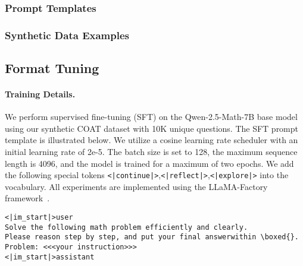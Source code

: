 \newpage
\subsubsection{Prompt Templates} \label{subsec:template}

\vspace{-1.5em}

\vspace{-1.5em}

\vspace{-1.5em}

\vspace{-1.5em}

\vspace{-1.5em}


\subsubsection{Synthetic Data Examples} \label{subsec:example-synthetic}






\clearpage
\subsection{Format Tuning}

\paragraph{Training Details.}
We perform supervised fine-tuning (SFT) on the Qwen-2.5-Math-7B base model using our synthetic COAT dataset with 10K unique questions. The SFT prompt template is illustrated below. We utilize a cosine learning rate scheduler with an initial learning rate of 2e-5. The batch size is set to 128, the maximum sequence length is 4096, and the model is trained for a maximum of two epochs. We add the following special tokens \texttt{<|continue|>},\texttt{<|reflect|>},\texttt{<|explore|>} into the vocabulary. All experiments are implemented using the LLaMA-Factory framework~\cite{llamafactory}.


\begin{tcolorbox}[green_box, title = {{Prompt Template 3: SFT and RL}}]
\label{box:prompt_template_3}
\begin{verbatim}
<|im_start|>user
Solve the following math problem efficiently and clearly.
Please reason step by step, and put your final answerwithin \boxed{}.
Problem: <<<your instruction>>>
<|im_start|>assistant
\end{verbatim}
\label{fig:sft_template}
\end{tcolorbox}


